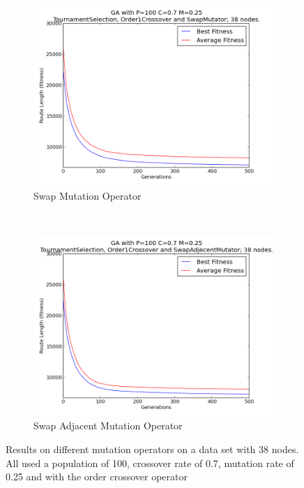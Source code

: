 \documentclass[10pt, a4paper]{article}
\begin{document}
\begin{figure}[h]
\centering
\begin{subfigure}[b]{0.67\textwidth}
\includegraphics[width=\textwidth]{img/results/order1crossover/swapmutator/n38p100c07m025}
\caption{Swap Mutation Operator}
\end{subfigure}
~
\begin{subfigure}[b]{0.67\textwidth}
\includegraphics[width=\textwidth]{img/results/order1crossover/swapadjecentmutator/n38p100c07m025}
\caption{Swap Adjacent Mutation Operator}
\end{subfigure}
\caption{Results on different mutation operators on a data set with 38 nodes.
         All used a population of 100, crossover rate of 0.7, mutation rate of
         0.25 and with the order crossover operator}
\label{fig:mutation-results}
\end{figure}
\end{document}
